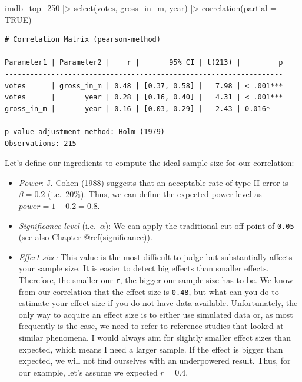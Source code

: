 \documentclass[
  letterpaper,
]{krantz}
\makeatletter
\newenvironment{Shaded}{\begin{snugshade}}{\end{snugshade}}
\newcommand{\AttributeTok}[1]{\textcolor[rgb]{0.40,0.45,0.13}{#1}}
\newcommand{\ConstantTok}[1]{\textcolor[rgb]{0.56,0.35,0.01}{#1}}
\newcommand{\FunctionTok}[1]{\textcolor[rgb]{0.28,0.35,0.67}{#1}}
\newcommand{\NormalTok}[1]{\textcolor[rgb]{0.00,0.23,0.31}{#1}}
\newcommand{\SpecialCharTok}[1]{\textcolor[rgb]{0.37,0.37,0.37}{#1}}
\newenvironment{kframe}{%
\medskip{}
\setlength{\fboxsep}{.8em}
 \def\at@end@of@kframe{}%
 \ifinner\ifhmode%
  \def\at@end@of@kframe{\end{minipage}}%
  \begin{minipage}{\columnwidth}%
 \fi\fi%
 \def\FrameCommand##1{\hskip\@totalleftmargin \hskip-\fboxsep
 \colorbox{shadecolor}{##1}\hskip-\fboxsep
     \hskip-\linewidth \hskip-\@totalleftmargin \hskip\columnwidth}%
 \MakeFramed {\advance\hsize-\width
   \@totalleftmargin\z@ \linewidth\hsize
   \@setminipage}}%
 {\par\unskip\endMakeFramed%
 \at@end@of@kframe}
\renewenvironment{Shaded}{\begin{kframe}}{\end{kframe}}
\makeatother
\begin{document}
\begin{Shaded}
\begin{Highlighting}[]
\NormalTok{imdb\_top\_250 }\SpecialCharTok{|\textgreater{}}
  \FunctionTok{select}\NormalTok{(votes, gross\_in\_m, year) }\SpecialCharTok{|\textgreater{}}
  \FunctionTok{correlation}\NormalTok{(}\AttributeTok{partial =} \ConstantTok{TRUE}\NormalTok{)}
\end{Highlighting}
\end{Shaded}

\begin{verbatim}
# Correlation Matrix (pearson-method)

Parameter1 | Parameter2 |    r |       95% CI | t(213) |         p
------------------------------------------------------------------
votes      | gross_in_m | 0.48 | [0.37, 0.58] |   7.98 | < .001***
votes      |       year | 0.28 | [0.16, 0.40] |   4.31 | < .001***
gross_in_m |       year | 0.16 | [0.03, 0.29] |   2.43 | 0.016*   

p-value adjustment method: Holm (1979)
Observations: 215
\end{verbatim}

Let's define our ingredients to compute the ideal sample size for our
correlation:

\begin{itemize}
\item
  \emph{Power}: J. Cohen (1988) suggests that an acceptable rate of type
  II error is \(\beta = 0.2\) (i.e.~20\%). Thus, we can define the
  expected power level as \(power = 1 - 0.2 = 0.8\).
\item
  \emph{Significance level} (i.e.~\(\alpha\)): We can apply the
  traditional cut-off point of \texttt{0.05} (see also Chapter
  @ref(significance)).
\item
  \emph{Effect size:} This value is the most difficult to judge but
  substantially affects your sample size. It is easier to detect big
  effects than smaller effects. Therefore, the smaller our \texttt{r},
  the bigger our sample size has to be. We know from our correlation
  that the effect size is \texttt{0.48}, but what can you do to estimate
  your effect size if you do not have data available. Unfortunately, the
  only way to acquire an effect size is to either use simulated data or,
  as most frequently is the case, we need to refer to reference studies
  that looked at similar phenomena. I would always aim for slightly
  smaller effect sizes than expected, which means I need a larger
  sample. If the effect is bigger than expected, we will not find
  ourselves with an underpowered result. Thus, for our example, let's
  assume we expected \(r = 0.4\).
\end{itemize}
\end{document}

